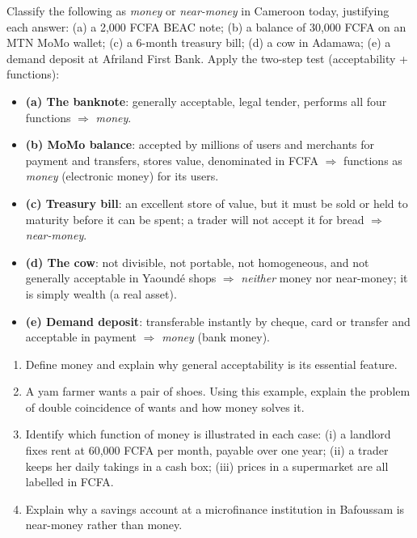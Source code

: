 \documentclass[11pt]{article}
\begin{document}
\begin{exoresolu}
Classify the following as \emph{money} or \emph{near-money} in Cameroon today, justifying each answer: (a) a 2,000 FCFA BEAC note; (b) a balance of 30,000 FCFA on an MTN MoMo wallet; (c) a 6-month treasury bill; (d) a cow in Adamawa; (e) a demand deposit at Afriland First Bank.
\tcblower
Apply the two-step test (acceptability + functions):
\begin{itemize}
\item \textbf{(a) The banknote}: generally acceptable, legal tender, performs all four functions $\Rightarrow$ \emph{money}.
\item \textbf{(b) MoMo balance}: accepted by millions of users and merchants for payment and transfers, stores value, denominated in FCFA $\Rightarrow$ functions as \emph{money} (electronic money) for its users.
\item \textbf{(c) Treasury bill}: an excellent store of value, but it must be sold or held to maturity before it can be spent; a trader will not accept it for bread $\Rightarrow$ \emph{near-money}.
\item \textbf{(d) The cow}: not divisible, not portable, not homogeneous, and not generally acceptable in Yaoundé shops $\Rightarrow$ \emph{neither} money nor near-money; it is simply wealth (a real asset).
\item \textbf{(e) Demand deposit}: transferable instantly by cheque, card or transfer and acceptable in payment $\Rightarrow$ \emph{money} (bank money).
\end{itemize}
\end{exoresolu}

\begin{exercice}
\begin{enumerate}
\item Define money and explain why general acceptability is its essential feature.
\item A yam farmer wants a pair of shoes. Using this example, explain the problem of double coincidence of wants and how money solves it.
\item Identify which function of money is illustrated in each case: (i) a landlord fixes rent at 60,000 FCFA per month, payable over one year; (ii) a trader keeps her daily takings in a cash box; (iii) prices in a supermarket are all labelled in FCFA.
\item Explain why a savings account at a microfinance institution in Bafoussam is near-money rather than money.
\end{enumerate}
\end{exercice}
\end{document}
